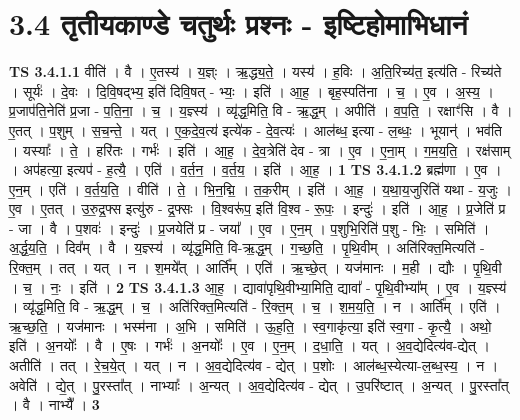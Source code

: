 \documentclass[17pt]{extarticle}
\begin{document}
\section*{ 3.4      तृतीयकाण्डे चतुर्थः प्रश्नः - इष्टिहोमाभिधानं }
                                \textbf{ TS 3.4.1.1} \newline
                  वीति॑ । वै । ए॒तस्य॑ । य॒ज्ञ्ः । ऋ॒द्ध्य॒ते॒ । यस्य॑ । ह॒विः । अ॒ति॒रिच्य॑त॒ इत्य॑ति - रिच्य॑ते । सूर्यः॑ । दे॒वः । दि॒वि॒षद्भ्य॒ इति॑ दिवि॒षत् - भ्यः॒ । इति॑ । आ॒ह॒ । बृह॒स्पति॑ना । च॒ । ए॒व । अ॒स्य॒ । प्र॒जाप॑ति॒नेति॑ प्र॒जा - प॒ति॒ना॒ । च॒ । य॒ज्ञ्स्य॑ । व्यृ॑द्ध॒मिति॒ वि - ऋ॒द्ध॒म् । अपीति॑ । व॒प॒ति॒ । रक्षाꣳ॑सि । वै । ए॒तत् । प॒शुम् । स॒च॒न्ते॒ । यत् । ए॒क॒दे॒व॒त्य॑ इत्ये॑क - दे॒व॒त्यः॑ । आल॑ब्ध॒ इत्या - ल॒ब्धः॒ । भूयान्॑ । भव॑ति । यस्याः᳚ । ते॒ । हरि॑तः । गर्भः॑ । इति॑ । आ॒ह॒ । दे॒व॒त्रेति॑ देव - त्रा । ए॒व । ए॒ना॒म् । ग॒म॒य॒ति॒ । रक्ष॑साम् । अप॑हत्या॒ इत्यप॑ - ह॒त्यै॒ । एति॑ । व॒र्त॒न॒ । व॒र्त॒य॒ । इति॑ । आ॒ह॒ । \textbf{  1} \newline
                  \newline
                                \textbf{ TS 3.4.1.2} \newline
                  ब्रह्म॑णा । ए॒व । ए॒न॒म् । एति॑ । व॒र्त॒य॒ति॒ । वीति॑ । ते॒ । भि॒न॒द्मि॒ । त॒क॒रीम् । इति॑ । आ॒ह॒ । य॒था॒य॒जुरिति॑ यथा - य॒जुः । ए॒व । ए॒तत् । उ॒रु॒द्र॒फ्स इत्यु॑रु - द्र॒फ्सः । वि॒श्वरू॑प॒ इति॑ वि॒श्व - रू॒पः॒ । इन्दुः॑ । इति॑ । आ॒ह॒ । प्र॒जेति॑ प्र - जा । वै । प॒शवः॑ । इन्दुः॑ । प्र॒जयेति॑ प्र - जया᳚ । ए॒व । ए॒न॒म् । प॒शुभि॒रिति॑ प॒शु - भिः॒ । समिति॑ । अ॒र्द्ध॒य॒ति॒ । दिव᳚म् । वै । य॒ज्ञ्स्य॑ । व्यृ॑द्ध॒मिति॒ वि-ऋ॒द्ध॒म् । ग॒च्छ॒ति॒ । पृ॒थि॒वीम् । अति॑रिक्त॒मित्यति॑ - रि॒क्त॒म् । तत् । यत् । न । श॒मये᳚त् । आर्ति᳚म् । एति॑ । ऋ॒च्छे॒त् । यज॑मानः । म॒ही । द्यौः । पृ॒थि॒वी । च॒ । नः॒ । इति॑ । \textbf{  2} \newline
                  \newline
                                \textbf{ TS 3.4.1.3} \newline
                  आ॒ह॒ । द्यावा॑पृथि॒वीभ्या॒मिति॒ द्यावा᳚ - पृ॒थि॒वीभ्या᳚म् । ए॒व । य॒ज्ञ्स्य॑ । व्यृ॑द्ध॒मिति॒ वि - ऋ॒द्ध॒म् । च॒ । अति॑रिक्त॒मित्यति॑ - रि॒क्त॒म् । च॒ । श॒म॒य॒ति॒ । न । आर्ति᳚म् । एति॑ । ऋ॒च्छ॒ति॒ । यज॑मानः । भस्म॑ना । अ॒भि । समिति॑ । ऊ॒ह॒ति॒ । स्व॒गाकृ॑त्या॒ इति॑ स्व॒गा - कृ॒त्यै॒ । अथो॒ इति॑ । अ॒नयोः᳚ । वै । ए॒षः । गर्भः॑ । अ॒नयोः᳚ । ए॒व । ए॒न॒म् । द॒धा॒ति॒ । यत् । अ॒व॒द्येदित्य॑व-द्येत् । अतीति॑ । तत् । रे॒च॒ये॒त् । यत् । न । अ॒व॒द्येदित्य॑व - द्येत् । प॒शोः । आल॑ब्ध॒स्येत्या-ल॒ब्ध॒स्य॒ । न । अवेति॑ । द्ये॒त् । पु॒रस्ता᳚त् । नाभ्याः᳚ । अ॒न्यत् । अ॒व॒द्येदित्य॑व - द्येत् । उ॒परि॑ष्टात् । अ॒न्यत् । पु॒रस्ता᳚त् । वै । नाभ्यै᳚ । \textbf{  3} \newline
\end{document}
